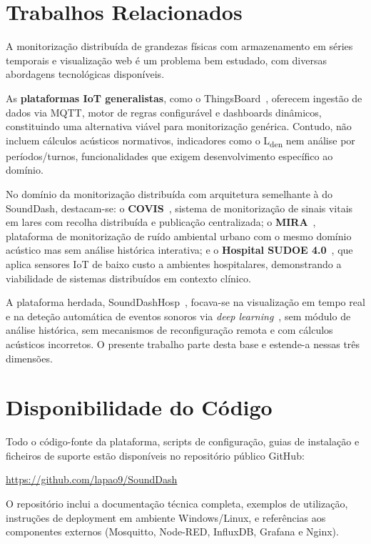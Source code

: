 \documentclass[12pt,a4paper]{report}
\begin{document}
\section{Trabalhos Relacionados}

A monitorização distribuída de grandezas físicas com armazenamento em séries temporais e visualização web é um problema bem estudado, com diversas abordagens tecnológicas disponíveis.

As \textbf{plataformas IoT generalistas}, como o ThingsBoard~\cite{thingsboard}, oferecem ingestão de dados via MQTT, motor de regras configurável e dashboards dinâmicos, constituindo uma alternativa viável para monitorização genérica. Contudo, não incluem cálculos acústicos normativos, indicadores como o L\textsubscript{den} nem análise por períodos/turnos,  funcionalidades que exigem desenvolvimento específico ao domínio.

No domínio da monitorização distribuída com arquitetura semelhante à do SoundDash, destacam-se: o \textbf{COVIS}~\cite{covis}, sistema de monitorização de sinais vitais em lares com recolha distribuída e publicação centralizada; o \textbf{MIRA}~\cite{mira}, plataforma de monitorização de ruído ambiental urbano com o mesmo domínio acústico mas sem análise histórica interativa; e o \textbf{Hospital SUDOE 4.0}~\cite{sudoe}, que aplica sensores IoT de baixo custo a ambientes hospitalares, demonstrando a viabilidade de sistemas distribuídos em contexto clínico.

A plataforma herdada, SoundDashHosp~\cite{prevSoundDash,soundmeterhosp}, focava-se na visualização em tempo real e na deteção automática de eventos sonoros via \textit{deep learning}~\cite{yamnet}, sem módulo de análise histórica, sem mecanismos de reconfiguração remota e com cálculos acústicos incorretos. O presente trabalho parte desta base e estende-a nessas três dimensões.

\section{Disponibilidade do Código}

Todo o código-fonte da plataforma, scripts de configuração, guias de instalação e ficheiros de suporte estão disponíveis no repositório público GitHub:

\url{https://github.com/lapao9/SoundDash}

O repositório inclui a documentação técnica completa, exemplos de utilização, instruções de deployment em ambiente Windows/Linux, e referências aos componentes externos (Mosquitto, Node-RED, InfluxDB, Grafana e Nginx).
\end{document}
